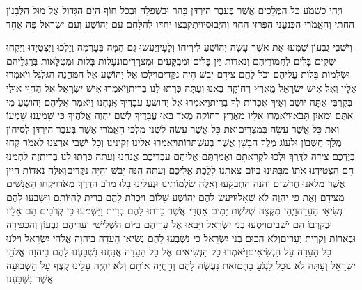 \documentclass[../main/main.tex]{subfiles}
\begin{document}
\begin{multicols*}{\ncols}
וַיְהִי כִשְׁמֹעַ כָּל הַמְּלָכִים אֲשֶׁר בְּעֵבֶר הַיַּרְדֵּן בָּהָר וּבַשְּׁפֵלָה וּבְכֹל חוֹף הַיָּם הַגָּדוֹל אֶל מוּל הַלְּבָנוֹן הַחִתִּי וְהָאֱמֹרִי הַכְּנַעֲנִי הַפְּרִזִּי הַחִוִּי וְהַיְבוּסִי\PreVerseSpace{}וַיִּתְקַבְּצוּ יַחְדָּו לְהִלָּחֵם עִם יְהוֹשֻׁעַ וְעִם יִשְׂרָאֵל פֶּה אֶחָד\OpenSection{}\par
{}וְיֹשְׁבֵי גִבְעוֹן שָׁמְעוּ אֵת אֲשֶׁר עָשָׂה יְהוֹשֻׁעַ לִירִיחוֹ וְלָעָי\PreVerseSpace{}וַיַּעֲשׂוּ גַם הֵמָּה בְּעָרְמָה וַיֵּלְכוּ וַיִּצְטַיָּדוּ\SubEnd{} וַיִּקְחוּ שַׂקִּים בָּלִים לַחֲמוֹרֵיהֶם וְנֹאדוֹת יַיִן בָּלִים וּמְבֻקָּעִים וּמְצֹרָרִים\PreVerseSpace{}וּנְעָלוֹת בָּלוֹת וּמְטֻלָּאוֹת בְּרַגְלֵיהֶם וּשְׂלָמוֹת בָּלוֹת עֲלֵיהֶם וְכֹל לֶחֶם צֵידָם יָבֵשׁ הָיָה נִקֻּדִים\PreVerseSpace{}וַיֵּלְכוּ אֶל יְהוֹשֻׁעַ אֶל הַמַּחֲנֶה הַגִּלְגָּל וַיֹּאמְרוּ אֵלָיו וְאֶל אִישׁ יִשְׂרָאֵל מֵאֶרֶץ רְחוֹקָה בָּאנוּ וְעַתָּה כִּרְתוּ לָנוּ בְרִית\PreVerseSpace{}וַיֹּאמְרוּ אִישׁ יִשְׂרָאֵל אֶל הַחִוִּי אוּלַי בְּקִרְבִּי אַתָּה יוֹשֵׁב וְאֵיךְ אֶכְרוֹת לְךָ בְרִית\PreVerseSpace{}וַיֹּאמְרוּ אֶל יְהוֹשֻׁעַ עֲבָדֶיךָ אֲנָחְנוּ וַיֹּאמֶר אֲלֵיהֶם יְהוֹשֻׁעַ מִי אַתֶּם וּמֵאַיִן תָּבֹאוּ\PreVerseSpace{}וַיֹּאמְרוּ אֵלָיו מֵאֶרֶץ רְחוֹקָה מְאֹד בָּאוּ עֲבָדֶיךָ לְשֵׁם יַהְוֶה אֱלֹהֶיךָ כִּי שָׁמַעְנוּ שָׁמְעוֹ וְאֵת כָּל אֲשֶׁר עָשָׂה בְּמִצְרָיִם\PreVerseSpace{}וְאֵת כָּל אֲשֶׁר עָשָׂה לִשְׁנֵי מַלְכֵי הָאֱמֹרִי אֲשֶׁר בְּעֵבֶר הַיַּרְדֵּן לְסִיחוֹן מֶלֶךְ חֶשְׁבּוֹן וּלְעוֹג מֶלֶךְ הַבָּשָׁן אֲשֶׁר בְּעַשְׁתָּרוֹת\PreVerseSpace{}וַיֹּאמְרוּ אֵלֵינוּ זְקֵינֵינוּ וְכָל יֹשְׁבֵי אַרְצֵנוּ לֵאמֹר קְחוּ בְיֶדְכֶם צֵידָה לַדֶּרֶךְ וּלְכוּ לִקְרָאתָם וַאֲמַרְתֶּם אֲלֵיהֶם עַבְדֵיכֶם אֲנַחְנוּ וְעַתָּה כִּרְתוּ לָנוּ בְרִית\PreVerseSpace{}זֶה לַחְמֵנוּ חָם הִצְטַיַּדְנוּ אֹתוֹ מִבָּתֵּינוּ בְּיוֹם צֵאתֵנוּ לָלֶכֶת אֲלֵיכֶם וְעַתָּה הִנֵּה יָבֵשׁ וְהָיָה נִקֻּדִים\PreVerseSpace{}וְאֵלֶּה נֹאדוֹת הַיַּיִן אֲשֶׁר מִלֵּאנוּ חֲדָשִׁים וְהִנֵּה הִתְבַּקָּעוּ וְאֵלֶּה שַׂלְמוֹתֵינוּ וּנְעָלֵינוּ בָּלוּ מֵרֹב הַדֶּרֶךְ מְאֹד\PreVerseSpace{}וַיִּקְחוּ הָאֲנָשִׁים מִצֵּידָם וְאֶת פִּי יַהְוֶה לֹא שָׁאָלוּ\PreVerseSpace{}וַיַּעַשׂ לָהֶם יְהוֹשֻׁעַ שָׁלוֹם וַיִּכְרֹת לָהֶם בְּרִית לְחַיּוֹתָם וַיִּשָּׁבְעוּ לָהֶם נְשִׂיאֵי הָעֵדָה\PreVerseSpace{}וַיְהִי מִקְצֵה שְׁלֹשֶׁת יָמִים אַחֲרֵי אֲשֶׁר כָּרְתוּ לָהֶם בְּרִית וַיִּשְׁמְעוּ כִּי קְרֹבִים הֵם אֵלָיו וּבְקִרְבּוֹ הֵם יֹשְׁבִים\PreVerseSpace{}וַיִּסְעוּ בְנֵי יִשְׂרָאֵל וַיָּבֹאוּ אֶל עָרֵיהֶם בַּיּוֹם הַשְּׁלִישִׁי וְעָרֵיהֶם גִּבְעוֹן וְהַכְּפִירָה וּבְאֵרוֹת וְקִרְיַת יְעָרִים\PreVerseSpace{}וְלֹא הִכּוּם בְּנֵי יִשְׂרָאֵל כִּי נִשְׁבְּעוּ לָהֶם נְשִׂיאֵי הָעֵדָה בַּיהוָה אֱלֹהֵי יִשְׂרָאֵל וַיִּלֹּנוּ כָל הָעֵדָה עַל הַנְּשִׂיאִים\PreVerseSpace{}וַיֹּאמְרוּ כָל הַנְּשִׂיאִים אֶל כָּל הָעֵדָה אֲנַחְנוּ נִשְׁבַּעְנוּ לָהֶם בַּיהוָה אֱלֹהֵי יִשְׂרָאֵל וְעַתָּה לֹא נוּכַל לִנְגֹּעַ בָּהֶם\PreVerseSpace{}זֹאת נַעֲשֶׂה לָהֶם וְהַחֲיֵה אוֹתָם וְלֹא יִהְיֶה עָלֵינוּ קֶצֶף עַל הַשְּׁבוּעָה אֲשֶׁר נִשְׁבַּעְנוּ 
\end{multicols*}
\end{document}
